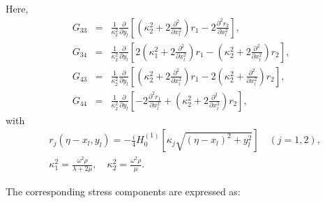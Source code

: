 Here,
\[
\begin{array}{rcl}
	G_{33} &=& \frac{1}{\kappa_2^2} \frac{\partial}{\partial y_{l}} \left[\left(\kappa_2^2 + 2\frac{\partial^2}{\partial x_{l}^2}\right) r_1 - 2 \frac{\partial^2 r_2}{\partial x_{l}^2} \right],
	\\[0.5em]
	G_{34} &=& \frac{1}{\kappa_2^2} \frac{\partial}{\partial y_{l}} \left[ 2\left(\kappa_1^2 + 2\frac{\partial^2}{\partial x_{l}^2} \right) r_1 - \left(\kappa_2^2 + 2\frac{\partial^2}{\partial x_{l}^2} \right) r_2 \right],
	\\[0.5em]
	G_{43} &=& \frac{1}{\kappa_2^2} \frac{\partial}{\partial y_{l}} \left[ \left(\kappa_2^2 + 2\frac{\partial^2}{\partial x_{l}^2} \right) r_1 - 2\left(\kappa_2^2 + \frac{\partial^2}{\partial x_{l}^2} \right) r_2 \right],
	\\[0.5em]
	G_{44} &=& \frac{1}{\kappa_2^2} \frac{\partial}{\partial y_{l}} \left[ -2\frac{\partial^2 r_1}{\partial x_{l}^2} + \left(\kappa_2^2 + 2\frac{\partial^2}{\partial x_{l}^2} \right) r_2 \right],
\end{array}
\]
with
\begin{align*}
&r_j(\eta - x_{l}, y_{l}) = -\frac{i}{4} H_0^{(1)}\left[\kappa_j \sqrt{(\eta - x_{l})^2 + y_{l}^2} \right] \quad (j = 1,2),
\\
&\kappa_1^2 = \frac{\omega^2 \rho}{\lambda + 2\mu}, \quad \kappa_2^2 = \frac{\omega^2 \rho}{\mu}.
\end{align*}

The corresponding stress components are expressed as:

